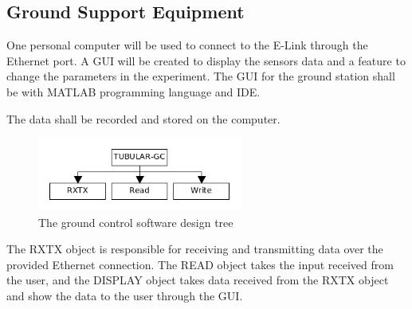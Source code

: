 \pagebreak
\subsection{Ground Support Equipment}
One personal computer will be used to connect to the E-Link through the Ethernet port. A GUI will be created to display the sensors data and a feature to change the parameters in the experiment. The GUI for the ground station shall be with MATLAB programming language and IDE.\par
The data shall be recorded and stored on the computer. 
\begin{figure}[H]
    \centering
    \includegraphics[width=0.6\textwidth]{4-experiment-design/img/gc-software-V1.png}
    \caption{The ground control software design tree}
    \label{fig:gcModel}
\end{figure}
The RXTX object is responsible for receiving and transmitting data over the provided Ethernet connection. The READ object takes the input received from the user, and the DISPLAY object takes data received from the RXTX object and show the data to the user through the GUI.


\raggedbottom